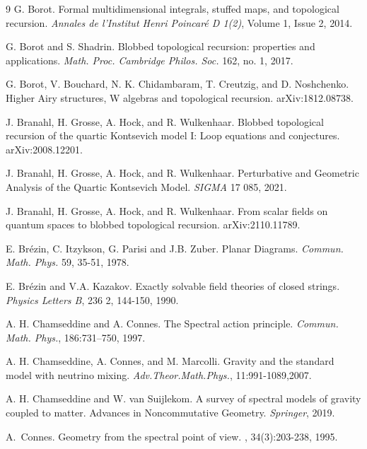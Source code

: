 \documentclass[10pt]{article}
\begin{document}
\begin{thebibliography}{9}
G. Borot. Formal multidimensional integrals, stuffed maps, and topological recursion. \textit{Annales de l’Institut Henri Poincaré D 1(2)}, Volume 1, Issue 2, 2014.



G. Borot and S. Shadrin. Blobbed topological recursion: properties and applications.\textit{ Math. Proc. Cambridge Philos. Soc.} 162, no. 1, 2017.

G. Borot, V. Bouchard, N. K. Chidambaram, T. Creutzig, and D. Noshchenko. Higher Airy structures, W algebras and topological recursion. arXiv:1812.08738.

J. Branahl, H. Grosse, A. Hock, and R. Wulkenhaar. Blobbed topological recursion of the quartic Kontsevich model I: Loop equations and conjectures. arXiv:2008.12201.

J. Branahl, H. Grosse, A. Hock, and R. Wulkenhaar. Perturbative and Geometric Analysis of the Quartic Kontsevich Model. \textit{SIGMA} 17 085, 2021.

J. Branahl, H. Grosse, A. Hock, and R. Wulkenhaar. From scalar fields on quantum spaces to blobbed topological recursion. 	arXiv:2110.11789.

E. Br\'{e}zin, C. Itzykson, G. Parisi and J.B. Zuber. Planar Diagrams. \textit{Commun. Math. Phys.} 59, 35-51, 1978.

E. Br\'{e}zin and  V.A. Kazakov.
Exactly solvable field theories of closed strings. \textit{Physics Letters B},
236 2, 144-150, 1990.

A. H. Chamseddine and A. Connes. The Spectral action principle. \textit{Commun. Math. Phys.},
186:731–750, 1997.



A. H. Chamseddine, A. Connes, and M. Marcolli. Gravity and the standard model with neutrino mixing. \textit{Adv.Theor.Math.Phys.}, 11:991-1089,2007.

A. H. Chamseddine and W. van Suijlekom. A survey of spectral models of gravity coupled
to matter. Advances in Noncommutative Geometry. \textit{Springer},  2019.




A.~Connes.
\newblock Geometry from the spectral point of view.
, 34(3):203-238, 1995.


\end{thebibliography}
\end{document}
